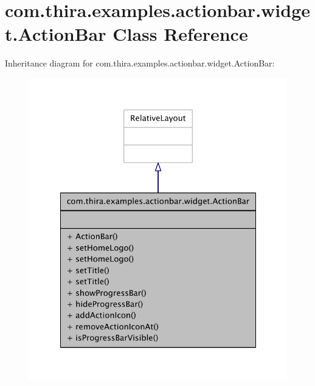 \hypertarget{classcom_1_1thira_1_1examples_1_1actionbar_1_1widget_1_1_action_bar}{\section{com.\-thira.\-examples.\-actionbar.\-widget.\-Action\-Bar Class Reference}
\label{classcom_1_1thira_1_1examples_1_1actionbar_1_1widget_1_1_action_bar}
}


Inheritance diagram for com.\-thira.\-examples.\-actionbar.\-widget.\-Action\-Bar\-:
\nopagebreak
\begin{figure}[H]
\begin{center}
\leavevmode
\includegraphics[width=324pt]{classcom_1_1thira_1_1examples_1_1actionbar_1_1widget_1_1_action_bar__inherit__graph}
\end{center}
\end{figure}


